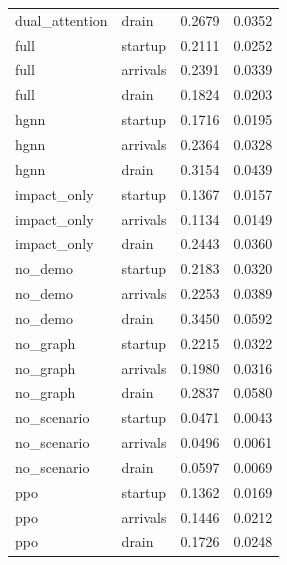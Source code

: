 \begin{tabular}{llll}
dual\_attention & drain & 0.2679 & 0.0352\\
full & startup & 0.2111 & 0.0252\\
full & arrivals & 0.2391 & 0.0339\\
full & drain & 0.1824 & 0.0203\\
hgnn & startup & 0.1716 & 0.0195\\
hgnn & arrivals & 0.2364 & 0.0328\\
hgnn & drain & 0.3154 & 0.0439\\
impact\_only & startup & 0.1367 & 0.0157\\
impact\_only & arrivals & 0.1134 & 0.0149\\
impact\_only & drain & 0.2443 & 0.0360\\
no\_demo & startup & 0.2183 & 0.0320\\
no\_demo & arrivals & 0.2253 & 0.0389\\
no\_demo & drain & 0.3450 & 0.0592\\
no\_graph & startup & 0.2215 & 0.0322\\
no\_graph & arrivals & 0.1980 & 0.0316\\
no\_graph & drain & 0.2837 & 0.0580\\
no\_scenario & startup & 0.0471 & 0.0043\\
no\_scenario & arrivals & 0.0496 & 0.0061\\
no\_scenario & drain & 0.0597 & 0.0069\\
ppo & startup & 0.1362 & 0.0169\\
ppo & arrivals & 0.1446 & 0.0212\\
ppo & drain & 0.1726 & 0.0248\\
\bottomrule
\end{tabular}